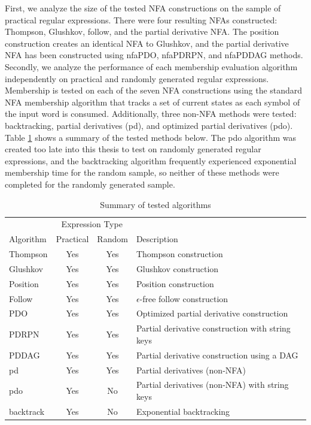 First, we analyze the size of the tested NFA constructions on the sample of practical regular expressions. There were four resulting NFAs constructed: Thompson, Glushkov, follow, and the partial derivative NFA. The position construction creates an identical NFA to Glushkov, and the partial derivative NFA has been constructed using nfaPDO, nfaPDRPN, and nfaPDDAG methods. Secondly, we analyze the performance of each membership evaluation algorithm independently on practical and randomly generated regular expressions. Membership is tested on each of the seven NFA constructions using the standard NFA membership algorithm that tracks a set of current states as each symbol of the input word is consumed. Additionally, three non-NFA methods were tested: backtracking, partial derivatives (pd), and optimized partial derivatives (pdo). Table \ref{tbl:Summary of algorithms} shows a summary of the tested methods below. The pdo algorithm was created too late into this thesis to test on randomly generated regular expressions, and the backtracking algorithm frequently experienced exponential membership time for the random sample, so neither of these methods were completed for the randomly generated sample.

\begin{table}[H]
  \doublespacing
  \centering
  \begin{tabular}{l| |c c l}
                & \multicolumn{2}{c}{Expression Type} \\
    Algorithm   & Practical & Random & Description \\
    \hline
    \hline
    Thompson    & Yes & Yes & Thompson construction \\
    Glushkov    & Yes & Yes & Glushkov construction \\
    Position    & Yes & Yes & Position construction \\
    Follow      & Yes & Yes & $\epsilon$-free follow construction \\
    PDO         & Yes & Yes & Optimized partial derivative construction \\
    PDRPN       & Yes & Yes & Partial derivative construction with string keys \\
    PDDAG       & Yes & Yes & Partial derivative construction using a DAG \\
    \hline
    pd          & Yes & Yes & Partial derivatives (non-NFA) \\
    pdo         & Yes & No  & Partial derivatives (non-NFA) with string keys \\
    backtrack   & Yes & No  & Exponential backtracking
  \end{tabular}
  \caption{Summary of tested algorithms}
  \label{tbl:Summary of algorithms}
\end{table}


